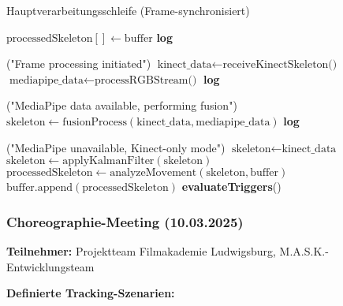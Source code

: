 \begin{algorithm}[H]
\caption{Hauptverarbeitungsschleife (Frame-synchronisiert)}\label{alg:main_processing}
\begin{algorithmic}[1]
    \State $\text{processedSkeleton}[] \leftarrow \text{buffer}$
    \State \textbf{log}\raggedright ("Frame processing initiated")
    \State $\text{kinect\_data} \leftarrow \text{receiveKinectSkeleton()}$
    \State $\text{mediapipe\_data} \leftarrow \text{processRGBStream()}$
        \State \textbf{log}\raggedright ("MediaPipe data available, performing fusion")
        \State $\text{skeleton} \leftarrow \text{fusionProcess}(\text{kinect\_data}, \text{mediapipe\_data})$
    \Else
        \State \textbf{log}\raggedright ("MediaPipe unavailable, Kinect-only mode")
        \State $\text{skeleton} \leftarrow \text{kinect\_data}$
    \EndIf
    \State $\text{skeleton} \leftarrow \text{applyKalmanFilter}(\text{skeleton})$
    \State $\text{processedSkeleton} \leftarrow \text{analyzeMovement}(\text{skeleton}, \text{buffer})$
    \State $\text{buffer.append}(\text{processedSkeleton})$
    \State \textbf{evaluateTriggers}()
\end{algorithmic}
\end{algorithm}

\subsubsection{Choreographie-Meeting (10.03.2025)}

\textbf{Teilnehmer:} Projektteam Filmakademie Ludwigsburg, M.A.S.K.-Entwicklungsteam

\textbf{Definierte Tracking-Szenarien:}

